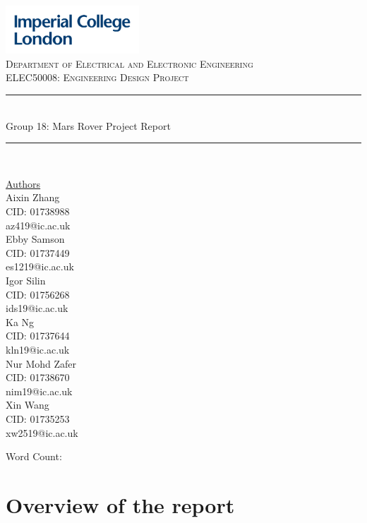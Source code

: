 \documentclass[11pt, a4paper]{article}
\begin{document}
\begin{titlepage}
	\newcommand{\HRule}{\rule{\linewidth}{0.5mm}}
    \includegraphics[width = 5cm]{./Images/Imperial_Logo.jpg} 
    \\
    \center 
	\textsc{\large Department of Electrical and Electronic Engineering }\\[0.5cm] 
	\textsc{\normalsize ELEC50008: Engineering Design Project}\\[0.5cm] 
    
	\HRule \\[0.4cm]
	Group 18: Mars Rover Project Report
    \HRule \\[1.5cm]
     
    \begin{center}
		\underline{Authors}\\[0.5cm] 
        Aixin Zhang \\ CID: 01738988 \\ az419@ic.ac.uk \\ [0.5cm]

        Ebby Samson \\ CID: 01737449 \\ es1219@ic.ac.uk \\ [0.5cm]
        
        Igor Silin \\ CID: 01756268 \\ ids19@ic.ac.uk \\ [0.5cm]

        Ka Ng \\ CID: 01737644 \\ kln19@ic.ac.uk \\ [0.5cm]

        Nur Mohd Zafer \\ CID: 01738670 \\ nim19@ic.ac.uk \\ [0.5cm]    
        
        Xin Wang \\ CID: 01735253 \\ xw2519@ic.ac.uk \\ [0.5cm]

	\end{center} \large
	

    \vfill 
 	\small Word Count:  \\ [0.5cm]
    \makeatletter
    \@date 
    \makeatother
\end{titlepage}

\tableofcontents
\pagebreak

\section{Overview of the report}
\end{document}
